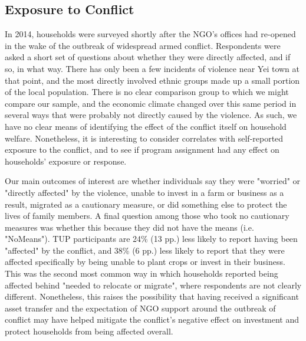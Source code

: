 \documentclass[12pt,article]{article}
\begin{document}
\subsection{Exposure to Conflict}
\label{sec-3-6}

In 2014, households were surveyed shortly after the NGO's offices had re-opened in
the wake of the outbreak of widespread armed conflict. Respondents were asked a short
set of questions about whether they were directly affected, and if so, in what way.
There has only been a few incidents of violence near Yei town at that point, and the most
directly involved ethnic groups made up a small portion of the local population. There
is no clear comparison group to which we might compare our sample, and the economic
climate changed over this same period in several ways that were probably not directly
caused by the violence. As such, we have no clear means of identifying the effect of
the conflict itself on household welfare. Nonetheless, it is interesting to consider
correlates with self-reported exposure to the conflict, and to see if program
assignment had any effect on households' exposure or response.

Our main outcomes of interest are whether individuals say they were "worried" or
"directly affected" by the violence, unable to invest in a farm or business as a
result, migrated as a cautionary measure, or did something else to protect the lives
of family members. A final question among those who took no cautionary measures was
whether this because they did not have the means (i.e. "NoMeans"). TUP participants
are 24\% (13 pp.) less likely to report having been "affected" by the conflict, and
38\% (6 pp.) less likely to report that they were affected specifically by being
unable to plant crops or invest in their business. This was the second most common
way in which households reported being affected behind "needed to relocate or
migrate", where respondents are not clearly different. Nonetheless, this raises the
possibility that having received a significant asset transfer and the expectation of
NGO support around the outbreak of
conflict may have helped mitigate the conflict's negative effect on investment and
protect households from being affected overall.
\end{document}
